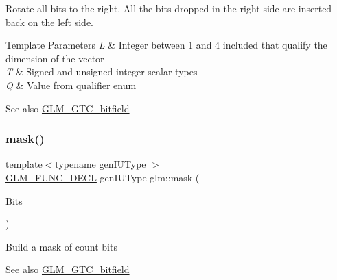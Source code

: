 Rotate all bits to the right. All the bits dropped in the right side are inserted back on the left side.


\begin{DoxyTemplParams}{Template Parameters}
{\em L} & Integer between 1 and 4 included that qualify the dimension of the vector \\
\hline
{\em T} & Signed and unsigned integer scalar types \\
\hline
{\em Q} & Value from qualifier enum\\
\hline
\end{DoxyTemplParams}
\begin{DoxySeeAlso}{See also}
\hyperlink{group__gtc__bitfield}{G\+L\+M\+\_\+\+G\+T\+C\+\_\+bitfield} 
\end{DoxySeeAlso}
\mbox{\label{group__gtc__bitfield_gad7eba518a0b71662114571ee76939f8a}} 
\subsubsection{\texorpdfstring{mask()}{mask()}\hspace{0.1cm}{\footnotesize\ttfamily [1/2]}}
{\footnotesize\ttfamily template$<$typename gen\+I\+U\+Type $>$ \\
\hyperlink{setup_8hpp_ab2d052de21a70539923e9bcbf6e83a51}{G\+L\+M\+\_\+\+F\+U\+N\+C\+\_\+\+D\+E\+CL} gen\+I\+U\+Type glm\+::mask (\begin{DoxyParamCaption}\item[{gen\+I\+U\+Type}]{Bits }\end{DoxyParamCaption})}

Build a mask of \textquotesingle{}count\textquotesingle{} bits

\begin{DoxySeeAlso}{See also}
\hyperlink{group__gtc__bitfield}{G\+L\+M\+\_\+\+G\+T\+C\+\_\+bitfield} 
\end{DoxySeeAlso}
\mbox{\label{group__gtc__bitfield_ga2e64e3b922a296033b825311e7f5fff1}} 
